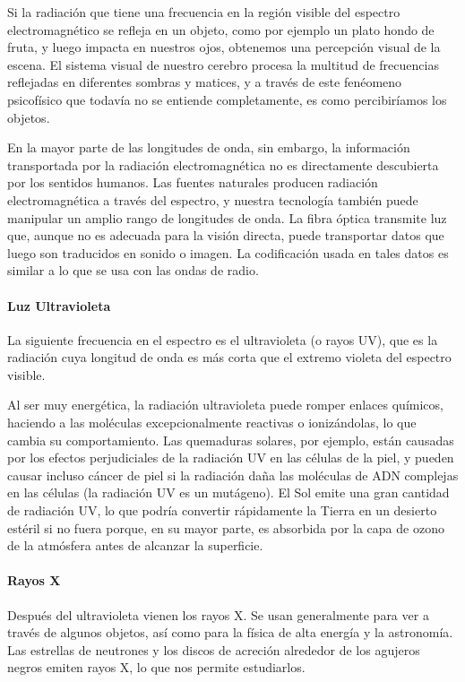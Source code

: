 \documentclass[12pt]{article}
\begin{document}
Si la radiaci\'on que tiene una frecuencia en la regi\'on visible del espectro electromagn\'etico se refleja en un objeto, como por ejemplo un plato hondo de fruta, y luego impacta en nuestros ojos, obtenemos una percepci\'on visual de la escena. El sistema visual de nuestro cerebro procesa la multitud de frecuencias reflejadas en diferentes sombras y matices, y a trav\'es de este fen\'eomeno psicof\'isico que todav\'ia no se entiende completamente, es como percibir\'iamos los objetos.
\vspace{0.4cm}

En la mayor parte de las longitudes de onda, sin embargo, la informaci\'on transportada por la radiaci\'on electromagn\'etica no es directamente descubierta por los sentidos humanos. Las fuentes naturales producen radiaci\'on electromagn\'etica a trav\'es del espectro, y nuestra tecnolog\'ia tambi\'en puede manipular un amplio rango de longitudes de onda. La fibra \'optica transmite luz que, aunque no es adecuada para la visi\'on directa, puede transportar datos que luego son traducidos en sonido o imagen. La codificaci\'on usada en tales datos es similar a lo que se usa con las ondas de radio.
\paragraph{Luz Ultravioleta}
La siguiente frecuencia en el espectro es el ultravioleta (o rayos UV), que es la radiaci\'on cuya longitud de onda es m\'as corta que el extremo violeta del espectro visible.
\vspace{0.4cm}

Al ser muy energ\'etica, la radiaci\'on ultravioleta puede romper enlaces qu\'imicos, haciendo a las mol\'eculas excepcionalmente reactivas o ioniz\'andolas, lo que cambia su comportamiento. Las quemaduras solares, por ejemplo, est\'an causadas por los efectos perjudiciales de la radiaci\'on UV en las c\'elulas de la piel, y pueden causar incluso c\'ancer de piel si la radiaci\'on da\~na las mol\'eculas de ADN complejas en las c\'elulas (la radiaci\'on UV es un mut\'ageno). El Sol emite una gran cantidad de radiaci\'on UV, lo que podr\'ia convertir r\'apidamente la Tierra en un desierto est\'eril si no fuera porque, en su mayor parte, es absorbida por la capa de ozono de la atm\'osfera antes de alcanzar la superficie.
\paragraph{Rayos X}
Despu\'es del ultravioleta vienen los rayos X. Se usan generalmente para ver a trav\'es de algunos objetos, as\'i como para la f\'isica de alta energ\'ia y la astronom\'ia. Las estrellas de neutrones y los discos de acreci\'on alrededor de los agujeros negros emiten rayos X, lo que nos permite estudiarlos.
\end{document}
